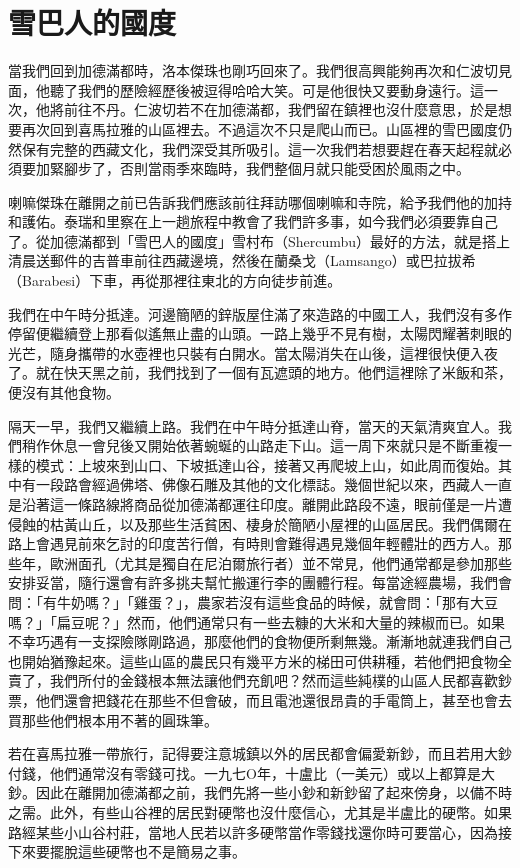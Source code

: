 \chapter{雪巴人的國度}

當我們回到加德滿都時，洛本傑珠也剛巧回來了。我們很高興能夠再次和仁波切見面，他聽了我們的歷險經歷後被逗得哈哈大笑。可是他很快又要動身遠行。這一次，他將前往不丹。仁波切若不在加德滿都，我們留在鎮裡也沒什麼意思，於是想要再次回到喜馬拉雅的山區裡去。不過這次不只是爬山而已。山區裡的雪巴國度仍然保有完整的西藏文化，我們深受其所吸引。這一次我們若想要趕在春天起程就必須要加緊腳步了，否則當雨季來臨時，我們整個月就只能受困於風雨之中。

喇嘛傑珠在離開之前已告訴我們應該前往拜訪哪個喇嘛和寺院，給予我們他的加持和護佑。泰瑞和里察在上一趟旅程中教會了我們許多事，如今我們必須要靠自己了。從加德滿都到「雪巴人的國度」雪村布（Shercumbu）最好的方法，就是搭上清晨送郵件的吉普車前往西藏邊境，然後在蘭桑戈（Lamsango）或巴拉拔希（Barabesi）下車，再從那裡往東北的方向徒步前進。

我們在中午時分抵達。河邊簡陋的鋅版屋住滿了來造路的中國工人，我們沒有多作停留便繼續登上那看似遙無止盡的山頭。一路上幾乎不見有樹，太陽閃耀著刺眼的光芒，隨身攜帶的水壺裡也只裝有白開水。當太陽消失在山後，這裡很快便入夜了。就在快天黑之前，我們找到了一個有瓦遮頭的地方。他們這裡除了米飯和茶，便沒有其他食物。

隔天一早，我們又繼續上路。我們在中午時分抵達山脊，當天的天氣清爽宜人。我們稍作休息一會兒後又開始依著蜿蜒的山路走下山。這一周下來就只是不斷重複一樣的模式：上坡來到山口、下坡抵達山谷，接著又再爬坡上山，如此周而復始。其中有一段路會經過佛塔、佛像石雕及其他的文化標誌。幾個世紀以來，西藏人一直是沿著這一條路線將商品從加德滿都運往印度。離開此路段不遠，眼前僅是一片遭侵蝕的枯黃山丘，以及那些生活貧困、棲身於簡陋小屋裡的山區居民。我們偶爾在路上會遇見前來乞討的印度苦行僧，有時則會難得遇見幾個年輕體壯的西方人。那些年，歐洲面孔（尤其是獨自在尼泊爾旅行者）並不常見，他們通常都是參加那些安排妥當，隨行還會有許多挑夫幫忙搬運行李的團體行程。每當途經農場，我們會問：「有牛奶嗎？」「雞蛋？」，農家若沒有這些食品的時候，就會問：「那有大豆嗎？」「扁豆呢？」然而，他們通常只有一些去糠的大米和大量的辣椒而已。如果不幸巧遇有一支探險隊剛路過，那麼他們的食物便所剩無幾。漸漸地就連我們自己也開始猶豫起來。這些山區的農民只有幾平方米的梯田可供耕種，若他們把食物全賣了，我們所付的金錢根本無法讓他們充飢吧？然而這些純樸的山區人民都喜歡鈔票，他們還會把錢花在那些不但會破，而且電池還很昂貴的手電筒上，甚至也會去買那些他們根本用不著的圓珠筆。

若在喜馬拉雅一帶旅行，記得要注意城鎮以外的居民都會偏愛新鈔，而且若用大鈔付錢，他們通常沒有零錢可找。一九七Ο年，十盧比（一美元）或以上都算是大鈔。因此在離開加德滿都之前，我們先將一些小鈔和新鈔留了起來傍身，以備不時之需。此外，有些山谷裡的居民對硬幣也沒什麼信心，尤其是半盧比的硬幣。如果路經某些小山谷村莊，當地人民若以許多硬幣當作零錢找還你時可要當心，因為接下來要擺脫這些硬幣也不是簡易之事。

